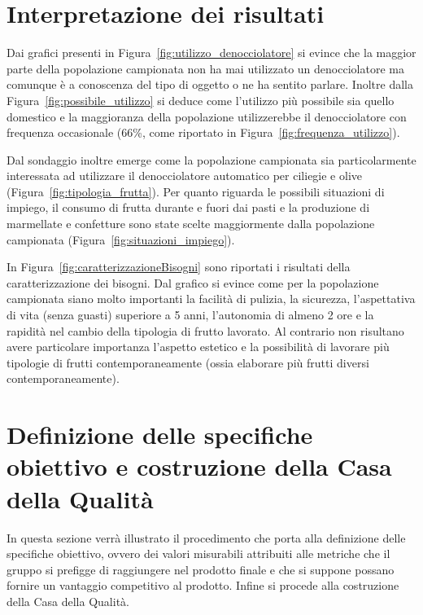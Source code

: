 \documentclass[12pt,a4paper,twoside]{report}  %
\begin{document}
\section{Interpretazione dei risultati}
Dai grafici presenti in Figura~\ref{fig:utilizzo_denocciolatore} si evince che la maggior parte della popolazione campionata non ha mai utilizzato un denocciolatore ma comunque è a conoscenza del tipo di oggetto o ne ha sentito parlare. Inoltre dalla Figura~\ref{fig:possibile_utilizzo}  si deduce come l'utilizzo più possibile sia quello domestico e la maggioranza della popolazione utilizzerebbe il denocciolatore con frequenza occasionale (66\%, come riportato in Figura~\ref{fig:frequenza_utilizzo}). 

Dal sondaggio inoltre emerge come la popolazione campionata sia particolarmente interessata ad utilizzare il denocciolatore automatico per ciliegie e olive (Figura~\ref{fig:tipologia_frutta}). Per quanto riguarda le possibili situazioni di impiego, il consumo di frutta durante e fuori dai pasti e la produzione di marmellate e confetture sono state scelte maggiormente dalla popolazione campionata (Figura~\ref{fig:situazioni_impiego}).

In Figura~\ref{fig:caratterizzazioneBisogni} sono riportati i risultati della caratterizzazione dei bisogni. Dal grafico si evince come per la popolazione campionata siano molto importanti la facilità di pulizia, la sicurezza, l'aspettativa di vita (senza guasti) superiore a 5 anni, l'autonomia di almeno 2 ore e la rapidità nel cambio della tipologia di frutto lavorato. Al contrario non risultano avere particolare importanza l'aspetto estetico e la possibilità di lavorare più tipologie di frutti contemporaneamente (ossia elaborare più frutti diversi contemporaneamente).

\section{Definizione delle specifiche obiettivo e costruzione della Casa della Qualità}
In questa sezione verrà illustrato il procedimento che porta alla definizione delle specifiche obiettivo, ovvero dei valori misurabili attribuiti alle metriche che il gruppo si prefigge di raggiungere nel prodotto finale e che si suppone possano fornire un vantaggio competitivo al prodotto. Infine si procede alla costruzione della Casa della Qualità.
\end{document}
